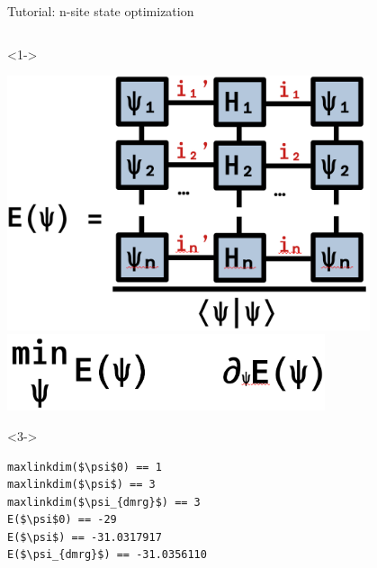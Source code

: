\begin{frame}[fragile]{Tutorial: n-site state optimization}
\begin{columns}
\begin{column}{5.5cm}
\begin{onlyenv}<1->
\vspace*{0.0cm}
\begin{center}
\includegraphics[width=0.8\textwidth]{
  slides/assets/psin_H_psin.png
} \\
\includegraphics[width=0.7\textwidth]{
  slides/assets/min_grad_E_psi.png
}
\end{center}
\vspace*{0.0cm}
\end{onlyenv}

\begin{onlyenv}<3->
\begin{lstlisting}[language=JuliaLocal, style=julia, mathescape, basicstyle=\scriptsize\ttfamily]
maxlinkdim($\psi$0) == 1
maxlinkdim($\psi$) == 3
maxlinkdim($\psi_{dmrg}$) == 3
E($\psi$0) == -29
E($\psi$) == -31.0317917
E($\psi_{dmrg}$) == -31.0356110
\end{lstlisting}
~\\
~\\
\end{onlyenv}


\end{column}

\end{columns}

\end{frame}
